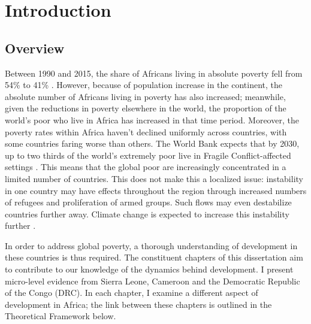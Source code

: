 \chapter{Introduction}
\section{Overview}



Between 1990 and 2015, the share of Africans living in absolute poverty fell from 54\% to 41\% \citep{Beegle2019}. However, because of population increase in the continent, the absolute number of Africans living in poverty has also increased; meanwhile, given the reductions in poverty elsewhere in the world, the proportion of the world's poor who live in Africa has increased in that time period.  Moreover, the poverty rates within Africa haven't declined uniformly across countries, with some countries faring worse than others. The World Bank expects that by 2030, up to two thirds of the world's extremely poor live in Fragile Conflict-affected settings \citep{WorldBank2019}. This means that the global poor are increasingly concentrated in a limited number of countries. This does not make this a localized issue: instability in one country may have effects throughout the region through increased numbers of refugees and proliferation of armed groups. Such flows may even destabilize countries further away. Climate change is expected to increase this instability further \citep{Burke2009}.

In order to address global poverty, a thorough understanding of development in these countries is thus required. The constituent chapters of this dissertation aim to contribute to our knowledge of the dynamics behind development. I present micro-level evidence from Sierra Leone, Cameroon and the Democratic Republic of the Congo (DRC). In each chapter, I examine a different aspect of development in Africa; the link between these chapters is outlined in the Theoretical Framework below.   

